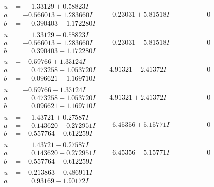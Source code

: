 \documentclass[1p]{elsarticle_modified}
\theoremstyle{definition}
\begin{document}
$$\begin{array}{c|c|c}
 \hline 
\begin{aligned}
u &= \phantom{-}1.33129 + 0.58823 I \\
a &= -0.566013 + 1.283660 I \\
b &= \phantom{-}0.390403 + 1.172280 I\end{aligned}
 & \phantom{-}0.23031 + 5.81518 I & \phantom{-0.000000 } 0 \\ \hline\begin{aligned}
u &= \phantom{-}1.33129 - 0.58823 I \\
a &= -0.566013 - 1.283660 I \\
b &= \phantom{-}0.390403 - 1.172280 I\end{aligned}
 & \phantom{-}0.23031 - 5.81518 I & \phantom{-0.000000 } 0 \\ \hline\begin{aligned}
u &= -0.59766 + 1.33124 I \\
a &= \phantom{-}0.473258 + 1.053720 I \\
b &= \phantom{-}0.096621 + 1.169710 I\end{aligned}
 & -4.91321 - 2.41372 I & \phantom{-0.000000 } 0 \\ \hline\begin{aligned}
u &= -0.59766 - 1.33124 I \\
a &= \phantom{-}0.473258 - 1.053720 I \\
b &= \phantom{-}0.096621 - 1.169710 I\end{aligned}
 & -4.91321 + 2.41372 I & \phantom{-0.000000 } 0 \\ \hline\begin{aligned}
u &= \phantom{-}1.43721 + 0.27587 I \\
a &= \phantom{-}0.143620 - 0.272951 I \\
b &= -0.557764 + 0.612259 I\end{aligned}
 & \phantom{-}6.45356 + 5.15771 I & \phantom{-0.000000 } 0 \\ \hline\begin{aligned}
u &= \phantom{-}1.43721 - 0.27587 I \\
a &= \phantom{-}0.143620 + 0.272951 I \\
b &= -0.557764 - 0.612259 I\end{aligned}
 & \phantom{-}6.45356 - 5.15771 I & \phantom{-0.000000 } 0 \\ \hline\begin{aligned}
u &= -0.213863 + 0.486911 I \\
a &= \phantom{-}0.93169 - 1.90172 I \\

\end{aligned}
\end{array}$$
\end{document}
